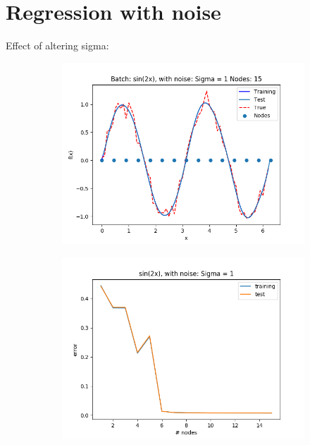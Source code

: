 \documentclass{article}
\begin{document}
\section{Regression with noise}
\FloatBarrier
Effect of altering sigma:
\FloatBarrier
\begin{figure}[ht!]
    \centering
    \begin{subfigure}[t]{0.4\textwidth}
        \centering
        \includegraphics[width=1\textwidth]{plots/noise/batch_sin2x_sigma1.png}
        \caption{}
    \end{subfigure}
    \begin{subfigure}[t]{0.4\textwidth}
        \centering
        \includegraphics[width=1\textwidth]{plots/noise/batch_sin2x_error_sigma1.png}

\end{subfigure}
\end{figure}
\end{document}
